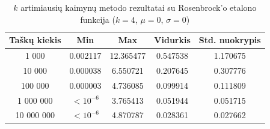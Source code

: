 \begin{table}[H]
    \centering
    \begin{tabular}{|c|c|c|c|c|}
        \hline
        \textbf{Taškų kiekis} & \textbf{Min} & \textbf{Max} & \textbf{Vidurkis} & \textbf{Std. nuokrypis} \\ \hline
        1 000        & 0.002117 & 12.365477 & 0.547538 & 1.170675 \\ \hline
        10 000       & 0.000038 & 6.550721 & 0.207645 & 0.307776 \\ \hline
        100 000      & 0.000003 & 4.736085 & 0.099914 & 0.111809 \\ \hline
        1 000 000    & $<10^{-6}$ & 3.765413 & 0.051944 & 0.051715 \\ \hline
        10 000 000   & $<10^{-6}$ & 4.870787 & 0.028361 & 0.027662 \\ \hline
    \end{tabular}
    \caption{$k$ artimiausių kaimynų metodo rezultatai su Rosenbrock'o etalono funkcija ($k = 4$, $\mu = 0$, $\sigma = 0$)}
\end{table}